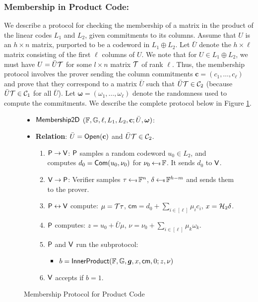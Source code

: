 \subsubsection{Membership in Product Code:}
We describe a protocol for checking the membership of a matrix in the  product of
the linear codes $L_1$ and $L_2$, given commitments to its columns. 
Assume that $U$ is an $h\times n$ matrix, purported to be a codeword in
$L_1\oplus L_2$. Let $\bar{U}$ denote the $h\times \ell$ matrix consisting of
the first $\ell$ columns of $U$. We note that for $U\in L_1\oplus L_2$, we must
have $U=\bar{U}\mathcal{T}$ for some $l\times n$ matrix $\mathcal{T}$ of rank $\ell$. Thus, the membership protocol involves the prover sending the column
commitments $\bm{c}=(c_1,\ldots,c_\ell)$ and prove that they correspond to a matrix
$\bar{U}$ such that $\bar{U}\mathcal{T}\in \mathcal{C}_2$ (because $\bar{U}\mathcal{T}\in
\mathcal{C}_1$ for all $\bar{U}$). Let $\bm{\omega}=(\omega_1,\ldots,\omega_\ell)$ denote the randomness used to compute the commitments. We describe the complete protocol below in Figure \ref{fig:protocol1}.
\begin{figure}[ht]
\begin{framed}
\begin{itemize}
\item {$\mathsf{Membership2D}$} $(\mathbb{F},\mathbb{G}, \ell, L_1, L_2,\mathbf{c}; \bar{U},\bm{\omega})$:
\item {\bf Relation}: $\bar{U}=\mathsf{Open}(\mathbf{c})$ and $\bar{U}\mathcal{T}\in \mathcal{C}_2$.
\begin{enumerate}[{\rm 1.}]
\item $\mathsf{P}\rightarrow\mathsf{V}$: $\mathsf{P}$ samples a random codeword $u_0\in
L_2$, and computes $d_0=\mathsf{Com}(u_0,\nu_0)$ for $\nu_0\hskip2.3pt{\gets\!\!\mbox{\tiny${\$}$\normalsize}}\, \mathbb{F}$. It sends $d_0$ to $\mathsf{V}$.
\item $\mathsf{V}\rightarrow \mathsf{P}$: Verifier samples $\tau\hskip2.3pt{\gets\!\!\mbox{\tiny${\$}$\normalsize}}\,
\mathbb{F}^n$, $\delta\hskip2.3pt{\gets\!\!\mbox{\tiny${\$}$\normalsize}}\, \mathbb{F}^{h-m}$ and sends them to the prover.
\item $\mathsf{P}\leftrightarrow \mathsf{V}$ compute: $\mu=\mathcal{T}\tau$,
$\mathsf{cm} = d_0+\sum_{i\in [\ell]} \mu_ic_i$, $x=\mathcal{H}_2\delta$.
\item $\mathsf{P}$ computes: $z=u_0+\bar{U}\mu$, $\nu=\nu_0+\sum_{i\in [\ell]}\mu_k\omega_k$.
\item $\mathsf{P}$ and $\mathsf{V}$ run the subprotocol:
	\begin{itemize}
	\item $b=\mathsf{InnerProduct}(\mathbb{F},\mathbb{G},\bm{g},x,\mathsf{cm},0;z,\nu)$
	\end{itemize}
\item $\mathsf{V}$ accepts if $b=1$.
\end{enumerate}
\end{itemize}
\end{framed}
\caption{Membership Protocol for Product Code}
\label{fig:protocol1}
\end{figure}

